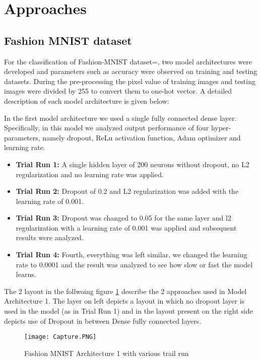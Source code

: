 \documentclass{article}
\begin{document}
\section{Approaches}
\subsection{Fashion MNIST dataset}

For the classification of Fashion-MNIST dataset=, two model architectures were developed and parameters such as accuracy were observed on training  and testing datasets. During the pre-processing the pixel value of training images and testing images were divided by 255 to convert them to one-hot vector. A detailed description of each model architecture is given below:

In the first model architecture we used a single fully connected dense layer. Specifically, in this model we analyzed output performance of four hyper-parameters, namely dropout, ReLu activation function, Adam optimizer and learning rate.
\begin{itemize}
    \item \textbf{Trial Run 1:} A single hidden layer of 200 neurons without dropout, no L2 regularization and no learning rate was applied.
    \item \textbf{Trial Run 2:} Dropout of 0.2 and L2 regularization was added with the learning rate of 0.001.
    \item \textbf{Trial Run 3:} Dropout was changed to 0.05 for the same layer and l2 regularization with a learning rate of 0.001 was applied and subsequent results were analyzed.
    \item \textbf{Trial Run 4:} Fourth, everything was left similar, we changed the learning rate to 0.0001 and the result was analyzed to see how slow or fast the model learns.
\end{itemize}

The 2 layout in the follwoing figure \ref{fig:compute} describe the 2 approaches used in Model Architecture 1. The layer on left depicts a layout in which no dropout layer is used in the model (as in Trial Run 1) and in the layout present on the right side depicts use of Dropout in between Dense fully connected layers.

\begin{figure}[H]
    \centering
    \texttt{[image: Capture.PNG]}
    \caption{Fashion MNIST Architecture 1 with various trail run}
    \label{fig:compute}
\end{figure}
\end{document}
